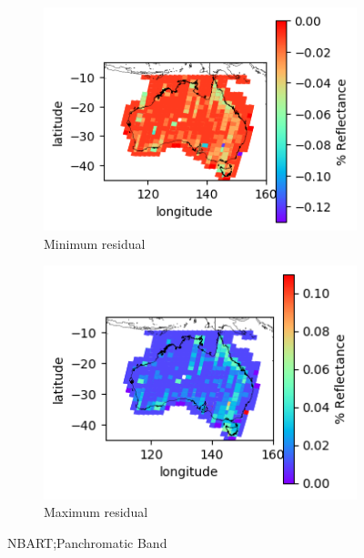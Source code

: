 \documentclass[a4paper]{article}
\begin{document}
      \begin{figure}[h!]
        \centering
          \begin{subfigure}[l]{.4\linewidth}
            \hspace{-32mm}
            \includegraphics[scale=0.9]{plots/nbart/nbart_panchromatic-MinResidual.png}
            \caption{Minimum residual}
          \end{subfigure}
%
          \begin{subfigure}[r]{.4\linewidth}
            \includegraphics[scale=0.9]{plots/nbart/nbart_panchromatic-MaxResidual.png}
            \caption{Maximum residual}
          \end{subfigure}
        \caption{NBART;\@ Panchromatic Band}\label{figure:13}
      \end{figure}
\end{document}
